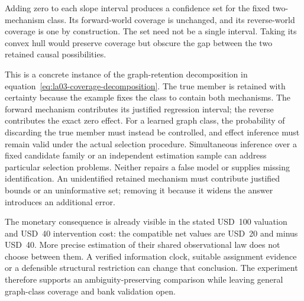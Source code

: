 Adding zero to each slope interval produces a confidence set for the fixed
two-mechanism class. Its forward-world coverage is unchanged, and its
reverse-world coverage is one by construction. The set need not be a single
interval. Taking its convex hull would preserve coverage but obscure the
gap between the two retained causal possibilities.

This is a concrete instance of the graph-retention decomposition in
equation~\eqref{eq:la03-coverage-decomposition}. The true member is retained
with certainty because the example fixes the class to contain both mechanisms.
The forward mechanism contributes its justified regression interval; the
reverse contributes the exact zero effect. For a learned graph class, the
probability of discarding the true member must instead be controlled, and
effect inference must remain valid under the actual selection procedure.
Simultaneous inference over a fixed candidate family or an independent
estimation sample can address particular selection problems. Neither repairs
a false model or supplies missing identification. An unidentified retained
mechanism must contribute justified bounds or an uninformative set; removing
it because it widens the answer introduces an additional error.

The monetary consequence is already visible in the stated USD~100 valuation
and USD~40 intervention cost: the compatible net values are USD~20 and
minus USD~40. More precise estimation of their shared observational law does
not choose between them. A verified information clock, suitable assignment
evidence or a defensible structural restriction can change that conclusion.
The experiment therefore supports an ambiguity-preserving comparison while
leaving general graph-class coverage and bank validation open.

